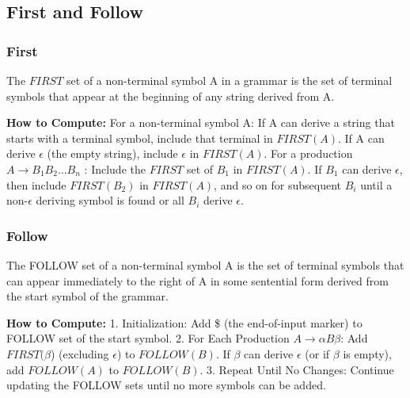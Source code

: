 
\subsection{First and Follow}
\subsubsection{First}
The $FIRST$ set of a non-terminal symbol A in a grammar is the set of terminal symbols that appear at the beginning of any string derived from A.

\textbf{How to Compute:}
For a non-terminal symbol A:
    If A can derive a string that starts with a terminal symbol, include that terminal in $FIRST(A)$.
    If A can derive $\epsilon$ (the empty string), include $\epsilon$ in $FIRST(A)$.
    For a production $A \rightarrow B_1 B_2 \ldots B_n$ :
    Include the $FIRST$ set of $B_1$ in $FIRST(A)$.
    If $B_1$ can derive $\epsilon$, then include $FIRST(B_2)$ in $FIRST(A)$, and so on for subsequent $B_i$ until a non-$\epsilon$ deriving symbol is found or all $B_i$ derive $\epsilon$.

\subsubsection{Follow}
The FOLLOW set of a non-terminal symbol A is the set of terminal symbols that can appear immediately to the right of A in some sentential form derived from the start symbol of the grammar.


\textbf{How to Compute:}
1. Initialization:
   Add \$ (the end-of-input marker) to FOLLOW set of the start symbol.
2. For Each Production $A \rightarrow \alpha B \beta$:
   Add $FIRST(\beta$) (excluding $\epsilon$) to $FOLLOW(B)$.
   If $\beta$ can derive $\epsilon$ (or if $\beta$ is empty), add $FOLLOW(A)$ to $FOLLOW(B)$.
3. Repeat Until No Changes:
   Continue updating the FOLLOW sets until no more symbols can be added.

